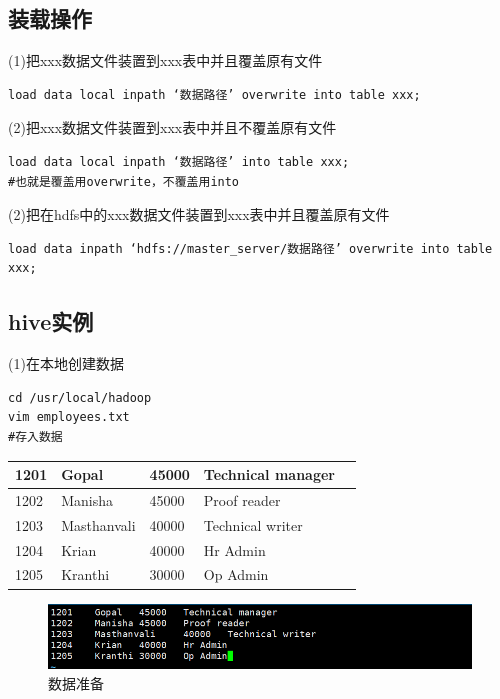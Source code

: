 \documentclass[12pt]{article}
\begin{document}
\subsection{装载操作}

(1)把xxx数据文件装置到xxx表中并且覆盖原有文件

\begin{lstlisting}[language={[ANSI]C}]
load data local inpath ‘数据路径’ overwrite into table xxx;
\end{lstlisting}

(2)把xxx数据文件装置到xxx表中并且不覆盖原有文件
\begin{lstlisting}[language={[ANSI]C}]
load data local inpath ‘数据路径’ into table xxx;
#也就是覆盖用overwrite，不覆盖用into
\end{lstlisting}

(2)把在hdfs中的xxx数据文件装置到xxx表中并且覆盖原有文件

\begin{lstlisting}[language={[ANSI]C}]
load data inpath ‘hdfs://master_server/数据路径’ overwrite into table xxx;
\end{lstlisting}

\subsection{hive实例}

(1)在本地创建数据

\begin{lstlisting}[language={[ANSI]C}]
cd /usr/local/hadoop
vim employees.txt
#存入数据
\end{lstlisting}

\begin{table}[!ht]

    \centering
    \begin{tabular}{|l|l|l|l|l|}
    \hline
        1201 & Gopal & 45000 & Technical manager  & \\ \hline
        1202 & Manisha & 45000 & Proof reader  &  \\ \hline
        1203 & Masthanvali & 40000 & Technical writer  & \\ \hline
        1204 & Krian & 40000 & Hr Admin  &  \\ \hline
        1205 & Kranthi & 30000 & Op Admin & \\ \hline
        \bottomrule
    \end{tabular}
\end{table}

\begin{figure}[ht]
\centering
\includegraphics[scale=1.0]{figures/16.png}
\caption{数据准备}\label{fig:label2}
\end{figure}
\end{document}
